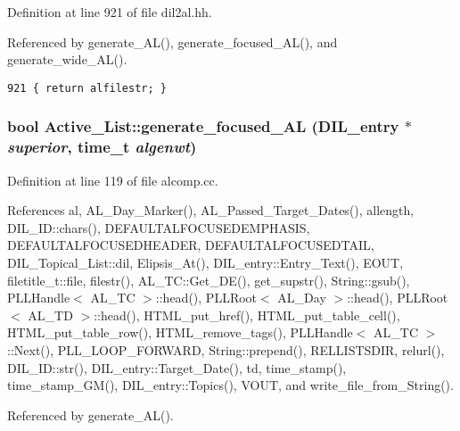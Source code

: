 Definition at line 921 of file dil2al.hh.

Referenced by generate\_\-AL(), generate\_\-focused\_\-AL(), and generate\_\-wide\_\-AL().



\footnotesize\begin{verbatim}921 { return alfilestr; }
\end{verbatim}\normalsize 
{}
\subsubsection{\setlength{\rightskip}{0pt plus 5cm}bool Active\_\-List::generate\_\-focused\_\-AL ({\bf DIL\_\-entry} $\ast$ {\em superior}, time\_\-t {\em algenwt})}\label{classActive__List_a16}




Definition at line 119 of file alcomp.cc.

References al, AL\_\-Day\_\-Marker(), AL\_\-Passed\_\-Target\_\-Dates(), allength, DIL\_\-ID::chars(), DEFAULTALFOCUSEDEMPHASIS, DEFAULTALFOCUSEDHEADER, DEFAULTALFOCUSEDTAIL, DIL\_\-Topical\_\-List::dil, Elipsis\_\-At(), DIL\_\-entry::Entry\_\-Text(), EOUT, filetitle\_\-t::file, filestr(), AL\_\-TC::Get\_\-DE(), get\_\-supstr(), String::gsub(), PLLHandle$<$ AL\_\-TC $>$::head(), PLLRoot$<$ AL\_\-Day $>$::head(), PLLRoot$<$ AL\_\-TD $>$::head(), HTML\_\-put\_\-href(), HTML\_\-put\_\-table\_\-cell(), HTML\_\-put\_\-table\_\-row(), HTML\_\-remove\_\-tags(), PLLHandle$<$ AL\_\-TC $>$::Next(), PLL\_\-LOOP\_\-FORWARD, String::prepend(), RELLISTSDIR, relurl(), DIL\_\-ID::str(), DIL\_\-entry::Target\_\-Date(), td, time\_\-stamp(), time\_\-stamp\_\-GM(), DIL\_\-entry::Topics(), VOUT, and write\_\-file\_\-from\_\-String().

Referenced by generate\_\-AL().



